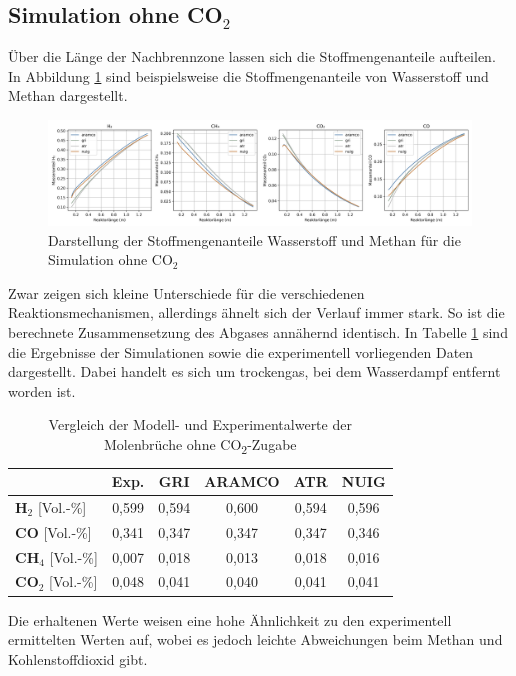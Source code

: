         \subsection{Simulation ohne CO$_2$}
        Über die Länge der Nachbrennzone lassen sich die Stoffmengenanteile aufteilen. In Abbildung \ref{fig:vergleich_h2_ch4_keinco2} sind beispielsweise die Stoffmengenanteile von Wasserstoff und Methan dargestellt.
        \begin{figure}[H]
            \centering
            \includegraphics[width=1\linewidth]{img/Vergleich_mech/CO_CO2_keinCO2.png}
            \caption{Darstellung der Stoffmengenanteile Wasserstoff und Methan für die Simulation ohne CO$_2$}
            \label{fig:vergleich_h2_ch4_keinco2}
        \end{figure}
        Zwar zeigen sich kleine Unterschiede für die verschiedenen Reaktionsmechanismen, allerdings ähnelt sich der Verlauf immer stark. So ist die berechnete Zusammensetzung des Abgases annähernd identisch. In Tabelle \ref{tab:vergleich_abgaszusammensetzung_keinco2} sind die Ergebnisse der Simulationen sowie die experimentell vorliegenden Daten dargestellt. Dabei handelt es sich um trockengas, bei dem Wasserdampf entfernt worden ist. 
        \begin{table}[H]
            \centering
            \caption{Vergleich der Modell- und Experimentalwerte der Molenbrüche ohne CO\textsubscript{2}-Zugabe}
            \label{tab:vergleich_abgaszusammensetzung_keinco2}
            \begin{tabular}{lccccc}
                \toprule
                & \textbf{Exp.} & \textbf{GRI} & \textbf{ARAMCO} & \textbf{ATR} & \textbf{NUIG} \\
                \midrule
                \textbf{H$_2$} [Vol.-\%] & 0,599 & 0,594 & 0,600 & 0,594 & 0,596 \\
                \textbf{CO} [Vol.-\%]& 0,341 & 0,347 & 0,347 & 0,347 & 0,346 \\
                \textbf{CH$_4$} [Vol.-\%]& 0,007 & 0,018 & 0,013 & 0,018 & 0,016 \\
                \textbf{CO$_2$} [Vol.-\%]& 0,048 & 0,041 & 0,040 & 0,041 & 0,041 \\
                \bottomrule
            \end{tabular}
        \end{table}
        Die erhaltenen Werte weisen eine hohe Ähnlichkeit zu den experimentell ermittelten Werten auf, wobei es jedoch leichte Abweichungen beim Methan und Kohlenstoffdioxid gibt. 
